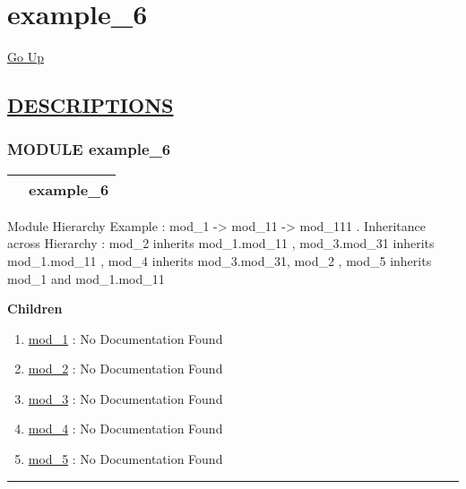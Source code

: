 \chapter*{\color{headfile}
example_6
}
\hypertarget{ecldoc:toc:example_6}{}
\hyperlink{ecldoc:toc:root}{Go Up}


\section*{\underline{\textsf{DESCRIPTIONS}}}
\subsection*{\textsf{\colorbox{headtoc}{\color{white} MODULE}
example\_6}}

\hypertarget{ecldoc:example_6}{}

{\renewcommand{\arraystretch}{1.5}
\begin{tabularx}{\textwidth}{|>{\raggedright\arraybackslash}l|X|}
\hline
\hspace{0pt}\mytexttt{\color{red} } & \textbf{example\_6} \\
\hline
\end{tabularx}
}

\par





Module Hierarchy Example : mod\_1 -> mod\_11 -> mod\_111 . Inheritance across Hierarchy : mod\_2 inherits mod\_1.mod\_11 , mod\_3.mod\_31 inherits mod\_1.mod\_11 , mod\_4 inherits mod\_3.mod\_31, mod\_2 , mod\_5 inherits mod\_1 and mod\_1.mod\_11







\textbf{Children}
\begin{enumerate}
\item \hyperlink{ecldoc:example_6.mod_1}{mod\_1}
: No Documentation Found
\item \hyperlink{ecldoc:example_6.mod_2}{mod\_2}
: No Documentation Found
\item \hyperlink{ecldoc:example_6.mod_3}{mod\_3}
: No Documentation Found
\item \hyperlink{ecldoc:example_6.mod_4}{mod\_4}
: No Documentation Found
\item \hyperlink{ecldoc:example_6.mod_5}{mod\_5}
: No Documentation Found
\end{enumerate}

\rule{\linewidth}{0.5pt}

